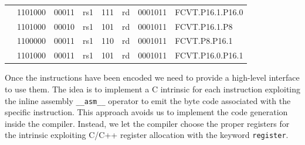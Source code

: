 \begin{table}
\begin{small}
\begin{center}
\begin{tabular}{p{0in}p{0.4in}p{0.05in}p{0.05in}p{0.05in}p{0.05in}p{0.4in}p{0.6in}p{0.4in}p{0.6in}p{0.7in}l}
&
\multicolumn{4}{|c|}{1101000} &
\multicolumn{2}{c|}{00011} &
\multicolumn{1}{c|}{rs1} &
\multicolumn{1}{c|}{111} &
\multicolumn{1}{c|}{rd} &
\multicolumn{1}{c|}{0001011} & FCVT.P16.1.P16.0 \\
\cline{2-11}


&
\multicolumn{4}{|c|}{1101000} &
\multicolumn{2}{c|}{00010} &
\multicolumn{1}{c|}{rs1} &
\multicolumn{1}{c|}{101} &
\multicolumn{1}{c|}{rd} &
\multicolumn{1}{c|}{0001011} & FCVT.P16.1.P8 \\
\cline{2-11}


&
\multicolumn{4}{|c|}{1100000} &
\multicolumn{2}{c|}{00011} &
\multicolumn{1}{c|}{rs1} &
\multicolumn{1}{c|}{110} &
\multicolumn{1}{c|}{rd} &
\multicolumn{1}{c|}{0001011} & FCVT.P8.P16.1 \\
\cline{2-11}


&
\multicolumn{4}{|c|}{1101000} &
\multicolumn{2}{c|}{00011} &
\multicolumn{1}{c|}{rs1} &
\multicolumn{1}{c|}{101} &
\multicolumn{1}{c|}{rd} &
\multicolumn{1}{c|}{0001011} & FCVT.P16.0.P16.1 \\
\cline{2-11}


\end{tabular}
\end{center}
\end{small}
\label{tab:rvxposit}
\end{table}


Once the instructions have been encoded we need to provide a high-level interface to use them. The idea is to implement a C intrinsic for each instruction exploiting the inline assembly \texttt{\_\_asm\_\_} operator to emit the byte code associated with the specific instruction.
This approach avoids us to implement the code generation inside the compiler. Instead, we let the compiler choose the proper registers for the intrinsic exploiting C/C++ register allocation with the keyword \texttt{register}.

